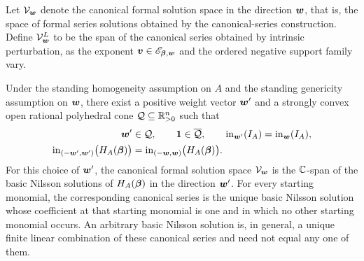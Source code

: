 Let \(\mathcal V_{\boldsymbol{w}}\) denote the canonical formal solution space in the direction \(\boldsymbol{w}\), that is, the space of formal series solutions obtained by the canonical-series construction.
Define \(\mathcal V_{\boldsymbol{w}}^{L}\) to be the span of the canonical series obtained by intrinsic perturbation, as the exponent \(\boldsymbol{v}\in\mathscr E_{\boldsymbol{\beta},\boldsymbol{w}}\) and the ordered negative support family vary.

\begin{proposition}
	\label{prop:canonical-nilsson-identification}
	Under the standing homogeneity assumption on \(A\) and the standing genericity assumption on \(\boldsymbol{w}\), there exist a positive weight vector \(\boldsymbol{w}'\) and a strongly convex open rational polyhedral cone \(\mathcal Q\subseteq\mathbb R_{>0}^n\) such that
	\begin{align*}
		\boldsymbol{w}' & \in\mathcal Q,
		\qquad
		\boldsymbol{1}\in\overline{\mathcal Q},
		\qquad
		\operatorname{in}_{\boldsymbol{w}'}(I_A)=\operatorname{in}_{\boldsymbol w}(I_A), \\
		\operatorname{in}_{(-\boldsymbol{w}',\boldsymbol{w}')}\bigl(H_A(\boldsymbol{\beta})\bigr)
		     & =
		\operatorname{in}_{(-\boldsymbol{w},\boldsymbol{w})}\bigl(H_A(\boldsymbol{\beta})\bigr).
	\end{align*}
	For this choice of \(\boldsymbol{w}'\), the canonical formal solution space \(\mathcal V_{\boldsymbol{w}}\) is the \(\mathbb C\)-span of the basic Nilsson solutions of \(H_A(\boldsymbol{\beta})\) in the direction \(\boldsymbol{w}'\).
	For every starting monomial, the corresponding canonical series is the unique basic Nilsson solution whose coefficient at that starting monomial is one and in which no other starting monomial occurs.
	An arbitrary basic Nilsson solution is, in general, a unique finite linear combination of these canonical series and need not equal any one of them.
\end{proposition}

